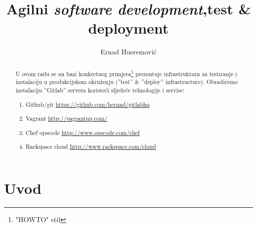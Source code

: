 \documentclass[times, utf8, seminar]{fit}
\begin{document}



\title{Agilni \emph{software development},\newline test \& deployment}

\author{Ernad Husremović}


\maketitle

\tableofcontents

\newpage

\begin{abstract}

U ovom radu se na bazi konkretnog primjera\footnote{"HOWTO" stil} prezentuje infrastruktura za testiranje i instalaciju u produkcijskom okruženju (''test'' \& ''deploy'' infrastructure). Obradićemo instalaciju ''Gitlab'' servera koristeći sljedeće tehnologije i servise:
\begin{enumerate}
  \item Github/git \url{https://github.com/hernad/gitlabhq}
  \item Vagrant  \url{http://vagrantup.com/}
  \item Chef opscode \url{http://www.opscode.com/chef}
  \item Rackspace cloud \url{http://www.rackspace.com/cloud}
\end{enumerate}

\end{abstract}


\chapter{Uvod}

\end{document}
